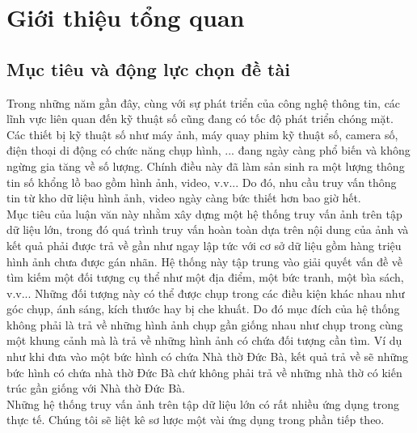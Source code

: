 
\chapter{Giới thiệu tổng quan}
\ifpdf
    \graphicspath{{Chapter1/Chapter1Figs/PNG/}{Chapter1/Chapter1Figs/PDF/}{Chapter1/Chapter1Figs/}}
\else
    \graphicspath{{Chapter1/Chapter1Figs/EPS/}{Chapter1/Chapter1Figs/}}
\fi
{}
\section{Mục tiêu và động lực chọn đề tài}
Trong những năm gần đây, cùng với sự phát triển của công nghệ thông tin, các lĩnh vực liên quan đến kỹ thuật số cũng đang có tốc độ phát triển chóng mặt. Các thiết bị kỹ thuật số như máy ảnh, máy quay phim kỹ thuật số, camera số, điện thoại di động có chức năng chụp hình, ... đang ngày càng phổ biến và không ngừng gia tăng về số lượng. Chính điều này đã làm sản sinh ra một lượng thông tin số khổng lồ bao gồm hình ảnh, video, v.v... Do đó, nhu cầu truy vấn thông tin từ kho dữ liệu hình ảnh, video ngày càng bức thiết hơn bao giờ hết.\\
Mục tiêu của luận văn này nhằm xây dựng một hệ thống truy vấn ảnh trên tập dữ liệu lớn, trong đó quá trình truy vấn hoàn toàn dựa trên nội dung của ảnh và kết quả phải được trả về gần như ngay lập tức với cơ sở dữ liệu gồm hàng triệu hình ảnh chưa được gán nhãn. Hệ thống này tập trung vào giải quyết vấn đề về tìm kiếm một đối tượng cụ thể như một địa điểm, một bức tranh, một bìa sách, v.v... Những đối tượng này có thể được chụp trong các điều kiện khác nhau như góc chụp, ánh sáng, kích thước hay bị che khuất. Do đó mục đích của hệ thống không phải là trả về những hình ảnh chụp gần giống nhau như chụp trong cùng một khung cảnh mà là trả về những hình ảnh có chứa đối tượng cần tìm. Ví dụ như khi đưa vào một bức hình có chứa Nhà thờ Đức Bà, kết quả trả về sẽ những bức hình có chứa nhà thờ Đức Bà chứ không phải trả về những nhà thờ có kiến trúc gần giống với Nhà thờ Đức Bà.\\
Những hệ thống truy vấn ảnh trên tập dữ liệu lớn có rất nhiều ứng dụng trong thực tế. Chúng tôi sẽ liệt kê sơ lược một vài ứng dụng trong phần tiếp theo.\\

